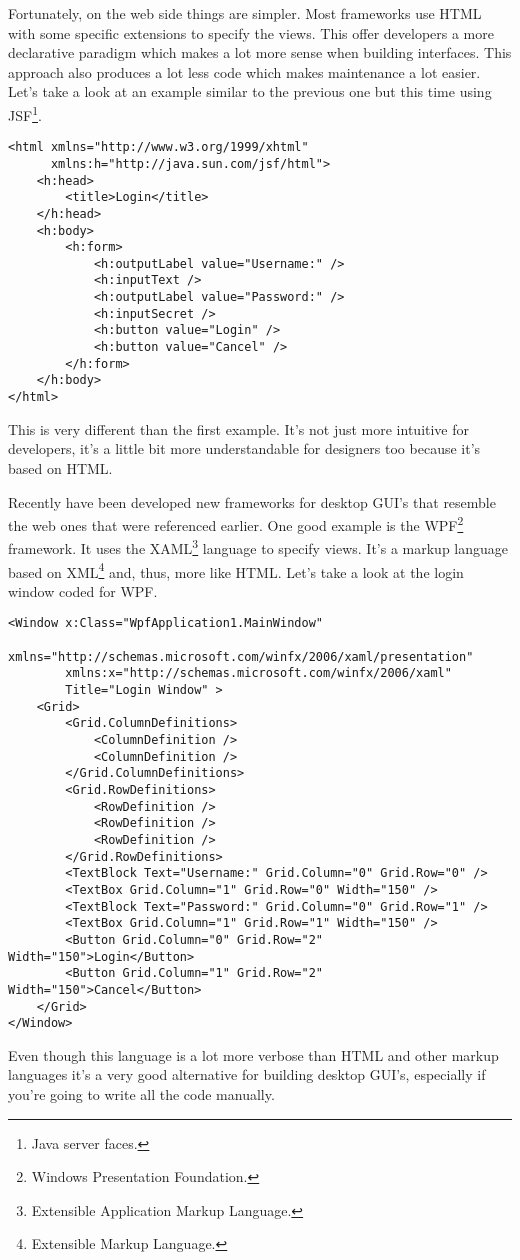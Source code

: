 Fortunately, on the web side things are simpler. Most frameworks use HTML with some specific extensions to specify the views. This offer developers a more declarative paradigm which makes a lot more sense when building interfaces. This approach also produces a lot less code which makes maintenance a lot easier. Let's take a look at an example similar to the previous one but this time using JSF\footnote{Java server faces.}.
\lstset{language=HTML}
\begin{lstlisting}[caption={Login window using JSF}]
<html xmlns="http://www.w3.org/1999/xhtml"
      xmlns:h="http://java.sun.com/jsf/html">
    <h:head>
        <title>Login</title>
    </h:head>
    <h:body>
        <h:form>
            <h:outputLabel value="Username:" />
            <h:inputText />
            <h:outputLabel value="Password:" />
            <h:inputSecret />
            <h:button value="Login" />
            <h:button value="Cancel" />
        </h:form>
    </h:body>
</html>
\end{lstlisting}
This is very different than the first example. It's not just more intuitive for developers, it's a little bit more understandable for designers too because it's based on HTML. 

Recently have been developed new frameworks for desktop GUI's that resemble the web ones that were referenced earlier. One good example is the WPF\footnote{Windows Presentation Foundation.} framework. It uses the XAML\footnote{Extensible Application Markup Language.} language to specify views. It's a markup language based on XML\footnote{Extensible Markup Language.} and, thus, more like HTML. Let's take a look at the login window coded for WPF.
\lstset{language=XML}
\begin{lstlisting}[caption={Login window using WPF}]
<Window x:Class="WpfApplication1.MainWindow"
        xmlns="http://schemas.microsoft.com/winfx/2006/xaml/presentation"
        xmlns:x="http://schemas.microsoft.com/winfx/2006/xaml"
        Title="Login Window" >
    <Grid>
        <Grid.ColumnDefinitions>
            <ColumnDefinition />
            <ColumnDefinition />
        </Grid.ColumnDefinitions>
        <Grid.RowDefinitions>
            <RowDefinition />
            <RowDefinition />
            <RowDefinition />
        </Grid.RowDefinitions>
        <TextBlock Text="Username:" Grid.Column="0" Grid.Row="0" />
        <TextBox Grid.Column="1" Grid.Row="0" Width="150" />
        <TextBlock Text="Password:" Grid.Column="0" Grid.Row="1" />
        <TextBox Grid.Column="1" Grid.Row="1" Width="150" />
        <Button Grid.Column="0" Grid.Row="2" Width="150">Login</Button>
        <Button Grid.Column="1" Grid.Row="2" Width="150">Cancel</Button>
    </Grid>
</Window>
\end{lstlisting}
Even though this language is a lot more verbose than HTML and other markup languages it's a very good alternative for building desktop GUI's, especially if you're going to write all the code manually.

